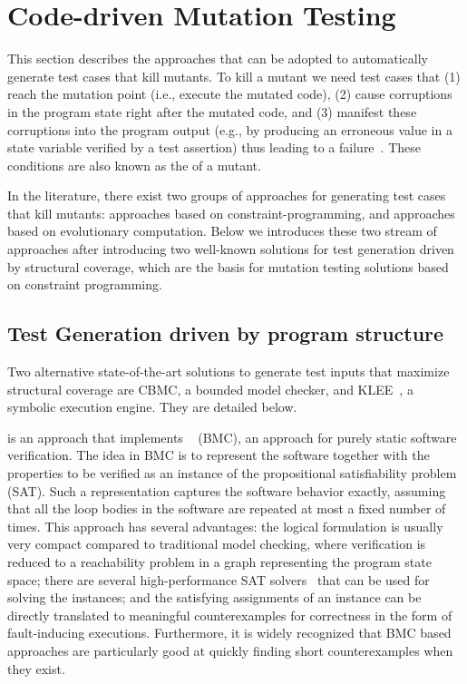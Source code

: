 
\clearpage
\section{Code-driven Mutation Testing}
\label{sec:back:testGeneration}

This section describes the approaches that can be adopted to automatically generate test cases that kill mutants.
To kill a mutant we need test cases that (1) reach the mutation point (i.e., execute the mutated code), (2) cause 
corruptions
in the program state right after the mutated code,
and (3) manifest these corruptions into the program output 
(e.g., by producing an erroneous value in a state variable verified by a test assertion) 
thus leading to a failure~\cite{papadakis2019mutation}. These conditions are also known as the  of a mutant.

In the literature, there exist two groups of approaches for 
generating test cases that kill mutants:
approaches based on constraint-programming, and approaches based on evolutionary computation. Below we introduces these two stream of approaches after introducing two well-known solutions for test generation driven by structural coverage, which are the basis for mutation testing solutions based on constraint programming.

\subsection{Test Generation driven by program structure}
\label{sec:back:generation:structure}
Two alternative state-of-the-art solutions to generate test inputs that maximize structural coverage are CBMC, a bounded model checker, and KLEE~\cite{cadar2008klee}, a symbolic execution engine. They are detailed below.


 is an approach that implements ~\cite{BiereCCZ:TACAS99,SeryFS:ATVA12} (BMC), an approach for purely static software verification.
The idea in BMC is to represent the software together with the
properties to be verified as an instance of the propositional
satisfiability problem (SAT).  Such a representation captures the
software behavior exactly, assuming that all the loop bodies in the
software are repeated at most a fixed number of times.
This approach has several advantages: the logical formulation is usually
very compact compared to traditional model checking, where verification
is reduced to a reachability problem in a graph representing the program
state space;
%
there are several high-performance SAT
solvers~\cite{MarquesSilva:IEEETRAN99,EenS:SAT2003} that can be used for
solving the instances;
%
and the satisfying assignments of an instance can be directly translated
to meaningful counterexamples for correctness in the form of
fault-inducing executions.
%
Furthermore, it is widely recognized that BMC based approaches are particularly good
at quickly finding short counterexamples when they exist.


